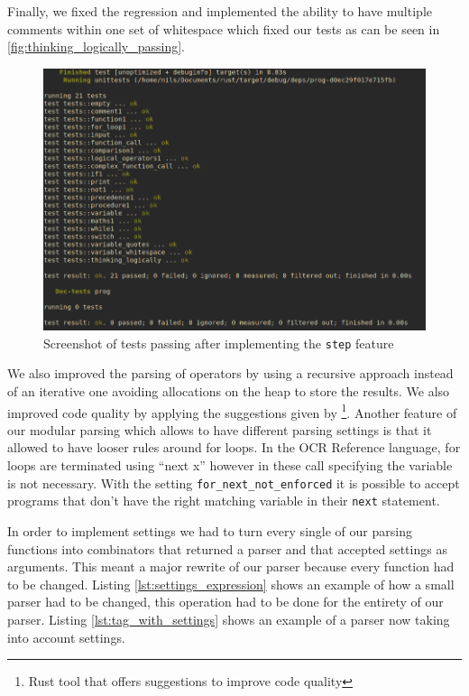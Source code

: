 \documentclass{article}
\begin{document}
Finally, we fixed the regression and implemented the ability to have multiple
comments within one set of whitespace which fixed our tests as can be seen in
\autoref{fig:thinking_logically_passing}.

\begin{figure}
	\includegraphics[width=\textwidth]{thinking_logically_passing}
	\caption{Screenshot of tests passing after implementing the \texttt{step}
	feature}
	\label{fig:thinking_logically_passing}
\end{figure}

We also improved the parsing of operators by using a recursive approach instead
of an iterative one avoiding allocations on the heap to store the results. We
also improved code quality by applying the suggestions given by
\footnote{Rust tool that offers suggestions to improve code
quality}. Another feature of our modular parsing which allows to have different
parsing settings is that it allowed to have looser rules around for loops. In
the OCR Reference language, for loops are terminated using ``next x'' however
in these call specifying the variable is not necessary. With the setting
\texttt{for\_next\_not\_enforced} it is possible to accept programs that don't
have the right matching variable in their \texttt{next} statement.

In order to implement settings we had to turn every single of our parsing
functions into combinators that returned a parser and that accepted settings as
arguments. This meant a major rewrite of our parser because every function had
to be changed. Listing \ref{lst:settings_expression} shows an example of how a
small parser had to be changed, this operation had to be done for the entirety
of our parser. Listing \ref{lst:tag_with_settings} shows an example of a parser
now taking into account settings.
\end{document}
